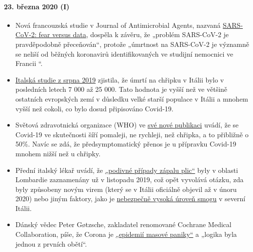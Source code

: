 \hypertarget{23-bux159ezna-2020-i}{%
\paragraph{23. března 2020 (I)}\label{23-bux159ezna-2020-i}}

\begin{itemize}
\tightlist
\item
  Nová francouzská studie v Journal of Antimicrobial Agents, nazvaná
  \href{https://www.sciencedirect.com/science/article/abs/pii/S0924857920300972}{SARS-CoV-2:
  fear versus data}, dospěla k závěru, že „problém SARS-CoV-2 je
  pravděpodobně přeceňován``, protože „úmrtnost na SARS-CoV-2 je
  významně se neliší od běžných koronavirů identifikovaných ve studijní
  nemocnici ve Francii ``.
\item
  \href{https://www.ijidonline.com/article/S1201-9712(19)30328-5/fulltext}{Italská
  studie z srpna 2019} zjistila, že úmrtí na chřipku v Itálii bylo v
  posledních letech 7 000 až 25 000. Tato hodnota je vyšší než ve
  většině ostatních evropských zemí v důsledku velké starší populace v
  Itálii a mnohem vyšší než cokoli, co bylo dosud připisováno Covid-19.
\item
  Světová zdravotnická organizace (WHO) ve
  \href{https://www.who.int/news-room/q-a-detail/q-a-similarities-and-differences-covid-19-and-influenza}{své
  nové publikaci} uvádí, že se Covid-19 ve skutečnosti šíří pomaleji, ne
  rychleji, než chřipka, a to přibližně o 50\%. Navíc se zdá, že
  předsymptomatický přenos je u přípravku Covid-19 mnohem nižší než u
  chřipky.
\item
  Přední italský lékař uvádí, že
  \href{https://www.scmp.com/news/china/society/article/3076334/coronavirus-strange-pneumonia-seen-lombardy-november-leading}{„podivné
  případy zápalu plic``} byly v oblasti Lombardie zaznamenány už v
  listopadu 2019, což opět vyvolává otázku, zda byly způsobeny novým
  virem (který se v Itálii oficiálně objevil až v únoru 2020) nebo jiným
  faktory, jako je
  \href{https://www.thelocal.it/20170131/our-lungs-are-breaking-smog-levels-way-above-safe-limits-in-northern-italy}{nebezpečně
  vysoká úroveň smogu} v severní Itálii.
\item
  Dánský vědec Peter Gøtzsche, zakladatel renomované Cochrane Medical
  Collaboration, píše, že Corona je
  \href{https://www.deadlymedicines.dk/corona-an-epidemic-of-mass-panic/}{„epidemií
  masové paniky``} a „logika byla jednou z prvních obětí``.
\end{itemize}

